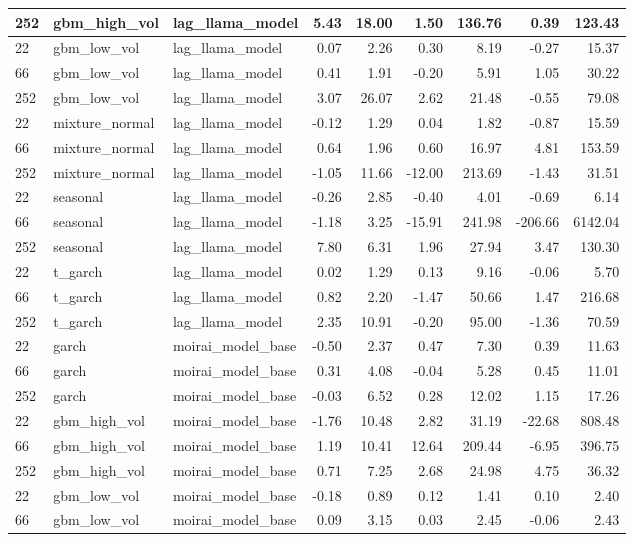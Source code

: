{\begin{tabular}{lllrrrrrr}
252 & gbm\_high\_vol & lag\_llama\_model & 5.43 & 18.00 & 1.50 & 136.76 & 0.39 & 123.43 \\
\midrule
22 & gbm\_low\_vol & lag\_llama\_model & 0.07 & 2.26 & 0.30 & 8.19 & -0.27 & 15.37 \\
66 & gbm\_low\_vol & lag\_llama\_model & 0.41 & 1.91 & -0.20 & 5.91 & 1.05 & 30.22 \\
252 & gbm\_low\_vol & lag\_llama\_model & 3.07 & 26.07 & 2.62 & 21.48 & -0.55 & 79.08 \\
\midrule
22 & mixture\_normal & lag\_llama\_model & -0.12 & 1.29 & 0.04 & 1.82 & -0.87 & 15.59 \\
66 & mixture\_normal & lag\_llama\_model & 0.64 & 1.96 & 0.60 & 16.97 & 4.81 & 153.59 \\
252 & mixture\_normal & lag\_llama\_model & -1.05 & 11.66 & -12.00 & 213.69 & -1.43 & 31.51 \\
\midrule
22 & seasonal & lag\_llama\_model & -0.26 & 2.85 & -0.40 & 4.01 & -0.69 & 6.14 \\
66 & seasonal & lag\_llama\_model & -1.18 & 3.25 & -15.91 & 241.98 & -206.66 & 6142.04 \\
252 & seasonal & lag\_llama\_model & 7.80 & 6.31 & 1.96 & 27.94 & 3.47 & 130.30 \\
\midrule
22 & t\_garch & lag\_llama\_model & 0.02 & 1.29 & 0.13 & 9.16 & -0.06 & 5.70 \\
66 & t\_garch & lag\_llama\_model & 0.82 & 2.20 & -1.47 & 50.66 & 1.47 & 216.68 \\
252 & t\_garch & lag\_llama\_model & 2.35 & 10.91 & -0.20 & 95.00 & -1.36 & 70.59 \\
\midrule
22 & garch & moirai\_model\_base & -0.50 & 2.37 & 0.47 & 7.30 & 0.39 & 11.63 \\
66 & garch & moirai\_model\_base & 0.31 & 4.08 & -0.04 & 5.28 & 0.45 & 11.01 \\
252 & garch & moirai\_model\_base & -0.03 & 6.52 & 0.28 & 12.02 & 1.15 & 17.26 \\
\midrule
22 & gbm\_high\_vol & moirai\_model\_base & -1.76 & 10.48 & 2.82 & 31.19 & -22.68 & 808.48 \\
66 & gbm\_high\_vol & moirai\_model\_base & 1.19 & 10.41 & 12.64 & 209.44 & -6.95 & 396.75 \\
252 & gbm\_high\_vol & moirai\_model\_base & 0.71 & 7.25 & 2.68 & 24.98 & 4.75 & 36.32 \\
\midrule
22 & gbm\_low\_vol & moirai\_model\_base & -0.18 & 0.89 & 0.12 & 1.41 & 0.10 & 2.40 \\
66 & gbm\_low\_vol & moirai\_model\_base & 0.09 & 3.15 & 0.03 & 2.45 & -0.06 & 2.43 \\

\end{tabular}}
